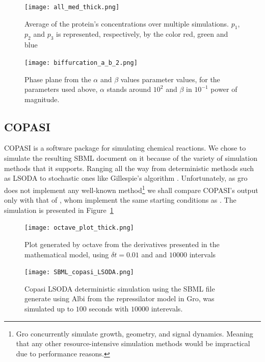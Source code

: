 \documentclass[12pt]{article}
\begin{document}
    \begin{figure}[ht]
    \centering
      \texttt{[image: all\_med\_thick.png]}
      \caption{Average of the protein's concentrations over multiple simulations. $p_{1}$, $p_{2}$ and $p_{3}$ is represented, respectively, by the color red, green and blue}
      \label{fig:repressilator_average}
    \endminipage\hfill
      \texttt{[image: biffurcation\_a\_b\_2.png]}
      \caption{
      Phase plane from the $\alpha$ and $\beta$ values parameter values, for the parameters used above, $\alpha$ stands around $10^{2}$ and $\beta$ in $10^{-1}$ power of magnitude.}
      \label{fig:biffurcation}
    \endminipage\hfill
    \end{figure}

\subsection{COPASI}
    
    COPASI is a software package for simulating chemical reactions. We chose to simulate the resulting SBML document on it because of the variety of simulation methods that it supports. Ranging all the way from deterministic methods such as LSODA \cite{Petzold1983} to stochastic ones like Gillespie’s algorithm \cite{Gillespie1976}. Unfortunately, as gro does not implement any well-known method\footnote{Gro concurrently simulate growth, geometry, and signal dynamics. Meaning that any other resource-intensive simulation methods would be impractical due to performance reasons.} we shall compare COPASI's output only with that of \cite{Goeldner2019}, whom implement the same starting conditions as \cite{ingalls2013mathematical}. The simulation is presented in Figure~\ref{fig:biffurcation}
    
    \begin{figure}[ht]
    \centering
      \texttt{[image: octave\_plot\_thick.png]}
      \caption{Plot generated by octave from the derivatives presented in the mathematical model, using $\delta{t} = 0.01$ and and $10000$ intervals}
      \label{fig:repressilator_octave}
    \endminipage\hfill
      \texttt{[image: SBML\_copasi\_LSODA.png]}
      \caption{Copasi LSODA deterministic simulation using the SBML file generate using Albi from the repressilator model in Gro, was simulated up to $100$ seconds with $10000$ interevals.}
      \label{fig:repressilator_copasi}
    \endminipage\hfill
    \end{figure}
    
\end{document}

